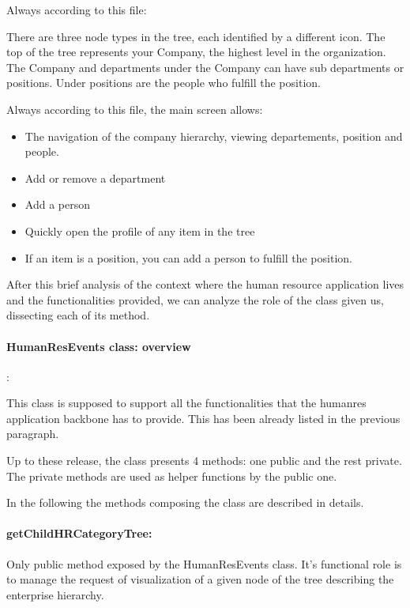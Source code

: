 Always according to this file:

There are three node types in the tree, each identified by a different icon. 
The top of the tree represents your Company, the highest level in the organization. The Company and departments under the Company can have sub departments or positions.
Under positions are the people who fulfill the position.

Always according to this file, the main screen allows:

\begin{itemize}
	\item The navigation of the company hierarchy, viewing departements, position and people.
	\item Add or remove a department
	\item Add a person
	\item Quickly open the profile of any item in the tree
	\item If an item is a position, you can add a person to fulfill the position.
\end{itemize}

After this brief analysis of the context where the human resource application lives and the functionalities provided, we can analyze the role of the class given us, dissecting each of its method.

\paragraph{HumanResEvents class: overview}:

This class is supposed to support all the functionalities that the humanres application backbone has to provide. This has been already listed in the previous paragraph.

Up to these release, the class presents 4 methods: one public and the rest private.
The private methods are used as helper functions by the public one.

In the following the methods composing the class are described in details.

\paragraph{getChildHRCategoryTree:}

Only public method exposed by the HumanResEvents class. It's functional role is to manage the request of visualization of a given node of the tree describing the enterprise hierarchy.

